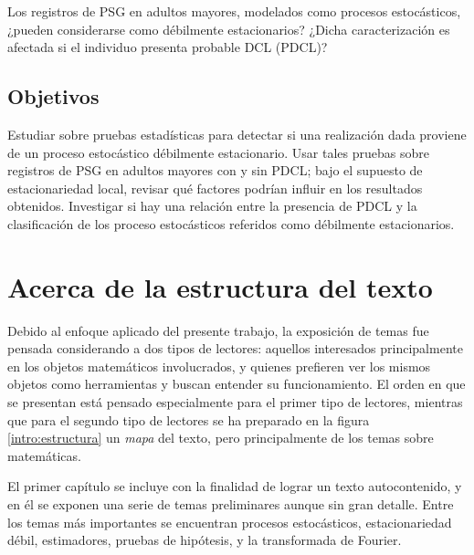\documentclass[12pt,letterpaper]{book}
\begin{document}
Los registros de PSG en adultos mayores, modelados como procesos estocásticos, ¿pueden considerarse como débilmente estacionarios?
%
¿Dicha caracterización es afectada si el individuo presenta probable DCL (PDCL)?


\subsection*{Objetivos}

Estudiar sobre pruebas estadísticas para detectar si una realización dada proviene de un proceso estocástico débilmente estacionario.
%
Usar tales pruebas sobre registros de PSG en adultos mayores con y sin PDCL; bajo el supuesto de estacionariedad local, revisar qué factores podrían influir en los resultados obtenidos.
%
Investigar si hay una relación entre la presencia de PDCL y la clasificación de los proceso estocásticos referidos como débilmente estacionarios.


\section*{Acerca de la estructura del texto}

Debido al enfoque aplicado del presente trabajo, la exposición de temas fue pensada considerando a dos tipos de lectores: aquellos interesados principalmente en los objetos matemáticos involucrados, y quienes prefieren ver los mismos objetos como herramientas y buscan entender su funcionamiento.
%
El orden en que se presentan está pensado especialmente para el primer tipo de lectores, mientras que para el segundo tipo de lectores se ha preparado en la figura \ref{intro:estructura} un \textit{mapa} del texto, pero principalmente de los temas sobre matemáticas.

El primer capítulo se incluye con la finalidad de lograr un texto autocontenido, y en él se exponen una serie de temas preliminares aunque sin gran detalle.
%
Entre los temas más importantes se encuentran procesos estocásticos, estacionariedad débil, estimadores, pruebas de hipótesis, y la transformada de Fourier.

\end{document}
